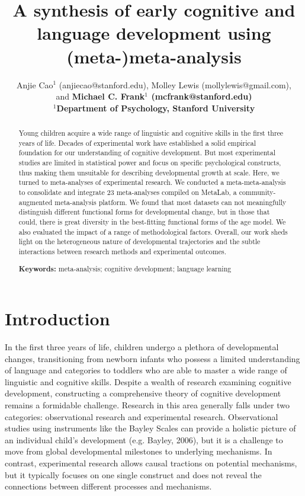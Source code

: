 \documentclass[10pt, letterpaper]{article}
\title{A synthesis of early cognitive and language development using
(meta-)meta-analysis}
\author{Anjie Cao$^1$  (anjiecao@stanford.edu), 
 Molley Lewis (mollylewis@gmail.com), \\
 and \bf{Michael C. Frank$^1$ (mcfrank@stanford.edu)} \\
$^1$Department of Psychology, Stanford University }
\begin{document}
\maketitle

\begin{abstract}
Young children acquire a wide range of linguistic and cognitive skills
in the first three years of life. Decades of experimental work have
established a solid empirical foundation for our understanding of
cognitive development. But most experimental studies are limited in
statistical power and focus on specific psychological constructs, thus
making them unsuitable for describing developmental growth at scale.
Here, we turned to meta-analyses of experimental research. We conducted
a meta-meta-analysis to consolidate and integrate 23 meta-analyses
compiled on MetaLab, a community-augmented meta-analysis platform. We
found that most datasets can not meaningfully distinguish different
functional forms for developmental change, but in those that could,
there is great diversity in the best-fitting functional forms of the age
model. We also evaluated the impact of a range of methodological
factors. Overall, our work sheds light on the heterogeneous nature of
developmental trajectories and the subtle interactions between research
methods and experimental outcomes.

\textbf{Keywords:}
meta-analysis; cognitive development; language learning
\end{abstract}

\hypertarget{introduction}{%
\section{Introduction}\label{introduction}}

In the first three years of life, children undergo a plethora of
developmental changes, transitioning from newborn infants who possess a
limited understanding of language and categories to toddlers who are
able to master a wide range of linguistic and cognitive skills. Despite
a wealth of research examining cognitive development, constructing a
comprehensive theory of cognitive development remains a formidable
challenge. Research in this area generally falls under two categories:
observational research and experimental research. Observational studies
using instruments like the Bayley Scales can provide a holistic picture
of an individual child's development (e.g. Bayley, 2006), but it is a
challenge to move from global developmental milestones to underlying
mechanisms. In contrast, experimental research allows causal tractions
on potential mechanisms, but it typically focuses on one single
construct and does not reveal the connections between different
processes and mechanisms.
\end{document}
